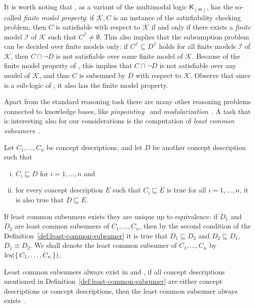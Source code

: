 It is worth noting that \ALC, as a variant of the multimodal logic
$\mathsf{K}_{(\mathsf{m})}$, has the so-called \emph{finite model property}: if
$\mathcal{K}, C$ is an instance of the satisfiability checking problem, then $C$ is
satisfiable with respect to $\mathcal{K}$ if and only if there exists a \emph{finite}
model $\mathcal{I}$ of $\mathcal{K}$ such that $C^{\mathcal{I}} \neq \emptyset$.  This
also implies that the subsumption problem can be decided over finite models only: if
$C^{\mathcal{I}} \subseteq D^{\mathcal{I}}$ holds for all finite models $\mathcal{I}$ of
$\mathcal{K}$, then $C \sqcap \neg D$ is not satisfiable over some finite model of
$\mathcal{K}$.  Because of the finite model property of \ALC, this implies that $C \sqcap
\neg D$ is not satisfiable over any model of $\mathcal{K}$, and thus $C$ is subsumed by
$D$ with respect to $\mathcal{K}$.  Observe that since \ELbot is a sub-logic of \ALC, it
also has the finite model property.

Apart from the standard reasoning task there are many other reasoning problems connected
to knowledge bases, like \emph{pinpointing}~\cite{DBLP:phd/de/Nyssen2009a} and
\emph{modularization}~\cite{DBLP:conf/www/GrauHKS07}.  A task that is interesting also for
our considerations is the computation of \emph{least common
  subsumers}~\cite{phd/de/Turhan2007,conf/ijcai/BaaderKM99}.

\begin{Definition}
  \label{def:least-common-subsumer}
  Let $C_1, \dots, C_n$ be concept descriptions, and let $D$ be another concept
  description such that
  \begin{enumerate}[i. ]
  \item $C_i \sqsubseteq D$ for $i = 1, \dots, n$ and
  \item for every concept description $E$ such that $C_i \sqsubseteq E$ is true for all $i
    = 1, \dots, n$, it is also true that $D \sqsubseteq E$.
  \end{enumerate}
\end{Definition}

If least common subsumers exists they are unique up to equivalence: if $D_1$ and $D_2$ are
least common subsumers of $C_1, \dots, C_n$, then by the second condition of the
Definition~\ref{def:least-common-subsumer} it is true that $D_1 \sqsubseteq D_2$ and $D_2
\sqsubseteq D_1$, \ie $D_1 \equiv D_2$.  We shall denote the least common subsumer of
$C_1, \dots, C_n$ by $\operatorname{lcs}({\{\,C_1, \dots, C_n\,\}})$.

Least common subsumers always exist in \EL and \ELbot, \ie if all concept descriptions
mentioned in Definition~\ref{def:least-common-subsumer} are either \EL concept
descriptions or \ELbot concept descriptions, then the least common subsumer always
exists~\cite{conf/ijcai/BaaderKM99}.

